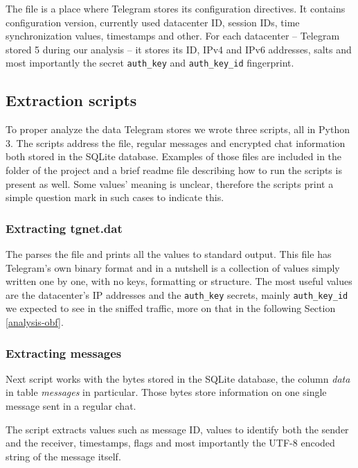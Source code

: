 \documentclass[thesis=M,english]{FITthesis}[2012/10/20]
\begin{document}
The  file is a place where Telegram stores its configuration directives. It contains configuration version, currently used datacenter ID, session IDs, time synchronization values, timestamps and other. For each datacenter -- Telegram stored 5 during our analysis -- it stores its ID, IPv4 and IPv6 addresses, salts and most importantly the secret \texttt{auth\_key} and \texttt{auth\_key\_id} fingerprint.

\subsection{Extraction scripts}\label{analysis-storage-scripts}

To proper analyze the data Telegram stores we wrote three scripts, all in Python 3. The scripts address the  file, regular messages and encrypted chat information both stored in the SQLite database. Examples of those files are included in the  folder of the project and a brief readme file describing how to run the scripts is present as well. Some values' meaning is unclear, therefore the scripts print a simple question mark in such cases to indicate this.

\subsubsection{Extracting tgnet.dat}

The  parses the  file and prints all the values to standard output. This file has Telegram's own binary format and in a nutshell is a collection of values simply written one by one, with no keys, formatting or structure. The most useful values are the datacenter's IP addresses and the \texttt{auth\_key} secrets, mainly \texttt{auth\_key\_id} we expected to see in the sniffed traffic, more on that in the following Section \ref{analysis-obf}.

\subsubsection{Extracting messages}

Next script  works with the bytes stored in the SQLite database, the column \emph{data} in table \emph{messages} in particular. Those bytes store information on one single message sent in a regular chat.

The script extracts values such as message ID, values to identify both the sender and the receiver, timestamps, flags and most importantly the UTF-8 encoded string of the message itself.
\end{document}
